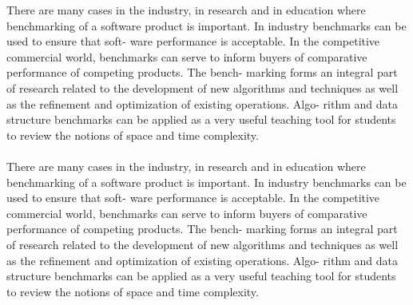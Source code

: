 There are many cases in the industry, in research and in education where benchmarking of
a software product is important. In industry benchmarks can be used to ensure that soft-
ware performance is acceptable. In the competitive commercial world, benchmarks can
serve to inform buyers of comparative performance of competing products. The bench-
marking forms an integral part of research related to the development of new algorithms
and techniques as well as the refinement and optimization of existing operations. Algo-
rithm and data structure benchmarks can be applied as a very useful teaching tool for
students to review the notions of space and time complexity.\\ \\
There are many cases in the industry, in research and in education where benchmarking of
a software product is important. In industry benchmarks can be used to ensure that soft-
ware performance is acceptable. In the competitive commercial world, benchmarks can
serve to inform buyers of comparative performance of competing products. The bench-
marking forms an integral part of research related to the development of new algorithms
and techniques as well as the refinement and optimization of existing operations. Algo-
rithm and data structure benchmarks can be applied as a very useful teaching tool for
students to review the notions of space and time complexity.
